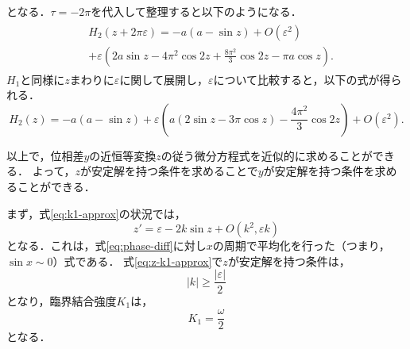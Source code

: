 \documentclass[../main]{subfiles}
\begin{document}
    となる．$\tau=-2\pi$を代入して整理すると以下のようになる．
    \begin{align}
        \begin{split}
            &H_2(z+2\pi\varepsilon )=-a(a-\sin z)+O(\varepsilon^2)\\
            &+\varepsilon\left( 2a\sin z-4\pi^2\cos2 z+\frac{8\pi^2}{3} \cos 2 z-\pi a\cos z\right).
        \end{split}
    \end{align}
    $H_1$と同様に$z$まわりに$\varepsilon$に関して展開し，$\varepsilon$について比較すると，以下の式が得られる．
    \begin{equation}
        \label{eq:nit-H2}
        H_2(z)=-a(a-\sin z)+\varepsilon\left( a(2\sin z-3\pi\cos z)-\frac{4\pi^2}{3} \cos 2 z\right)+O(\varepsilon^2).
    \end{equation}

    以上で，位相差$y$の近恒等変換$z$の従う微分方程式を近似的に求めることができる．
    よって，$z$が安定解を持つ条件を求めることで$y$が安定解を持つ条件を求めることができる．
    
    まず，式\eqref{eq:k1-approx}の状況では，
    \begin{equation}
        z'=\varepsilon-2k\sin z+O(k^2,\varepsilon k)
        \label{eq:z-k1-approx}
    \end{equation}
    となる．これは，式\eqref{eq:phase-diff}に対し$x$の周期で平均化を行った（つまり，$\sin x\sim 0$）式である．
    式\eqref{eq:z-k1-approx}で$z$が安定解を持つ条件は，
    \begin{equation}
        |k|\geq\frac{|\varepsilon|}{2}
    \end{equation}
    となり，臨界結合強度$K_1$は，
    \begin{equation}
        \label{eq:K1-approx}
        K_1=\frac{\omega}{2}
    \end{equation}
    となる．
\end{document}
